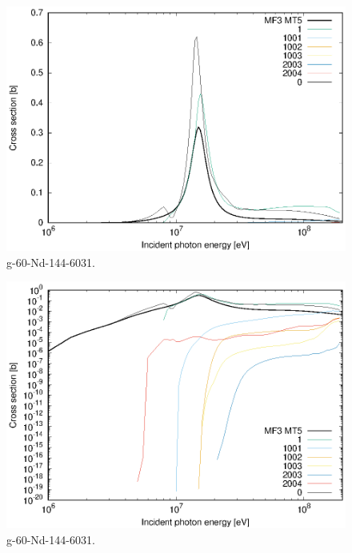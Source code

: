 \begin{figure}
 \includegraphics[width=\linewidth]{eps/g_60-Nd-144_6031.eps}
  \caption{g-60-Nd-144-6031.}
\end{figure}
\begin{figure}
 \includegraphics[width=\linewidth]{eps-log/g_60-Nd-144_6031.eps}
 \caption{g-60-Nd-144-6031.}
\end{figure}
\newpage \clearpage

